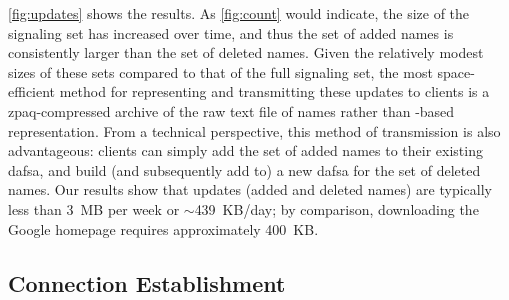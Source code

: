 \autoref{fig:updates} shows the results. As
\autoref{fig:count} would indicate, the size of the signaling set has increased
over time, and thus the set of added names is consistently larger than the set
of deleted names. Given the relatively modest sizes of these sets compared to
that of the full signaling set, the most space-efficient method for representing
and transmitting these updates to clients is a zpaq-compressed archive
of the raw text file of names rather than -based representation. From
a technical perspective, this method of transmission is also advantageous:
clients can simply add the set of added names to their existing \ac{dafsa}, and
build (and subsequently add to) a new \ac{dafsa} for the set of deleted names.
Our results show that updates (added and deleted names) are typically less than
3~MB per week or $\sim$439~KB/day; by comparison, downloading the Google
homepage requires approximately 400~KB.


\subsection{Connection Establishment}
\label{sec:evaluation:performance}



